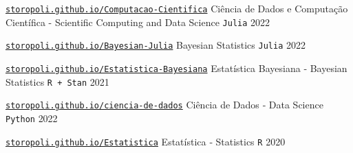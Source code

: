 

\begin{cventries}

  \cventry
    {\href{https://storopoli.github.io/Computacao-Cientifica/}{\texttt{storopoli.github.io/Computacao-Cientifica}}} %
    {Ciência de Dados e Computação Científica - Scientific Computing and Data Science} %
    {\texttt{Julia}} %
    {2022} %

  \cventry
    {\href{https://storopoli.github.io/Bayesian-Julia/}{\texttt{storopoli.github.io/Bayesian-Julia}}} %
    {Bayesian Statistics} %
    {\texttt{Julia}} %
    {2022} %

  \cventry
    {\href{https://storopoli.github.io/Estatistica-Bayesiana/}{\texttt{storopoli.github.io/Estatistica‑Bayesiana}}} %
    {Estatística Bayesiana ‑ Bayesian Statistics} %
    {\texttt{R + Stan}} %
    {2021} %

  \cventry
    {\href{https://storopoli.github.io/ciencia-de-dados}{\texttt{storopoli.github.io/ciencia-de-dados}}} %
    {Ciência de Dados ‑ Data Science} %
    {\texttt{Python}} %
    {2022} %

  \cventry
    {\href{https://storopoli.github.io/Estatistica/}{\texttt{storopoli.github.io/Estatistica}}} %
    {Estatística ‑ Statistics} %
    {\texttt{R}} %
    {2020} %

\end{cventries}
